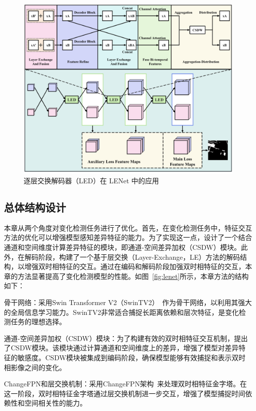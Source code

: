 \begin{figure}[!htbp]
  \centering
  \includegraphics[width=\textwidth]{paper_figures/基于双时相遥感影像特征交互的变化检测算法研究/LENet/led.png}
  \caption{逐层交换解码器（LED）在 LENet 中的应用}
  \label{fig:led}
\end{figure}

\subsection{总体结构设计}
本章从两个角度对变化检测任务进行了优化。首先，在变化检测任务中，特征交互方法的优化可以增强模型感知差异特征的能力。为了实现这一点，设计了一个结合通道和空间维度计算差异特征的模块，即通道-空间差异加权（CSDW）模块。此外，在解码阶段，构建了一个基于层交换（Layer-Exchange，LE）方法的解码结构，以增强双时相特征的交互。通过在编码和解码阶段加强双时相特征的交互，本章的方法显著提高了变化检测模型的性能。如图~\ref{fig:lenet}所示，本章方法的结构如下：

骨干网络：采用Swin Transformer V2（SwinTV2）~\cite{liu_swin_2021-5}作为骨干网络，以利用其强大的全局信息学习能力。SwinTV2非常适合捕捉长距离依赖和层次特征，是变化检测任务的理想选择。

通道-空间差异加权（CSDW）模块：为了构建有效的双时相特征交互机制，提出了CSDW模块。该模块通过计算通道和空间维度上的差异，增强了模型对差异特征的敏感度。CSDW模块被集成到编码阶段，确保模型能够有效捕捉和表示双时相影像之间的变化。

ChangeFPN和层交换机制：采用ChangeFPN架构~\cite{dong_efficientcd_2024}来处理双时相特征金字塔。在这一阶段，双时相特征金字塔通过层交换机制进一步交互，增强了模型捕捉时间依赖性和空间相关性的能力。

